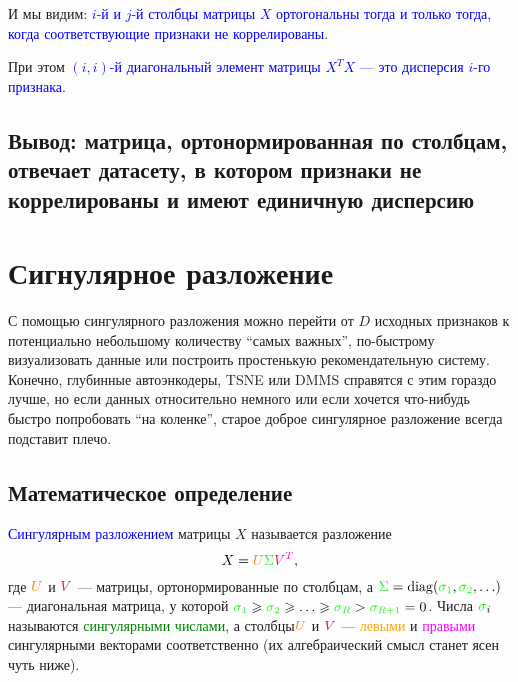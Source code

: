 \documentclass{amsart}
\theoremstyle{definition}
\theoremstyle{remark}
\numberwithin{equation}{section}
\begin{document}
\begin{center}
\end{center}

И мы видим: \textcolor{blue}{$i$-й и $j$-й столбцы матрицы $X$ ортогональны тогда и только тогда, когда соответствующие признаки не коррелированы}.

При этом \textcolor{blue}{$(i,i)$-й диагональный элемент матрицы $X^TX$ --- это дисперсия $i$-го признака}.

\subsection{Вывод: матрица, ортонормированная по столбцам, отвечает датасету, в котором признаки не коррелированы и имеют единичную дисперсию}

\section{Сигнулярное разложение}

С помощью сингулярного разложения можно перейти от $D$ исходных признаков к потенциально небольшому количеству ``самых важных'', по-быстрому визуализовать данные или построить простенькую рекомендательную систему. Конечно, глубинные автоэнкодеры, TSNE или DMMS справятся с этим гораздо лучше, но если данных относительно немного или если хочется что-нибудь быстро попробовать ``на коленке'', старое доброе сингулярное разложение всегда подставит плечо.

\subsection{Математическое определение} \textcolor{blue}{Сингулярным разложением} матрицы $X$ называется разложение
$$X = \textcolor{orange}{U}\textcolor{green}{\Sigma}\textcolor{magenta}{V^T},$$
где $\textcolor{orange}{U}$ и $\textcolor{magenta}{V}$ --- матрицы, ортонормированные по столбцам, а $\textcolor{green}{\Sigma} = \mathrm{diag}(\textcolor{green}{\sigma_1},\textcolor{green}{\sigma_2},\ldots)$ --- диагональная матрица, у которой $\textcolor{green}{\sigma_1}\geqslant\textcolor{green}{\sigma_2}\geqslant\ldots\geqslant\textcolor{green}{\sigma_R}>\textcolor{green}{\sigma_{R+1}}=0$. Числа $\textcolor{green}{\sigma}_i$ называются \textcolor{green} {сингулярными числами}, а столбцы$\textcolor{orange}{U}$ и $\textcolor{magenta}{V}$ --- \textcolor{orange}{левыми} и \textcolor{magenta}{правыми} сингулярными векторами соответственно (их алгебраический смысл станет ясен чуть ниже).
\end{document}
